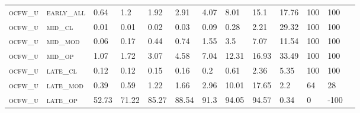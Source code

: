 \begin{landscape}
\begin{table}[!htbp]
\begin{tabular}{@{}lllllllllllll@{}}
\footnotesize \textsc{ocfw\_u}     & \footnotesize \textsc{early\_all}                & \footnotesize 0.64          & \footnotesize 1.2            & \footnotesize 1.92             & \footnotesize 2.91            & \footnotesize 4.07            & \footnotesize 8.01            & \footnotesize 15.1       & \footnotesize 17.76    & \footnotesize 100    & \footnotesize 100    \\
\footnotesize \textsc{ocfw\_u}     & \footnotesize \textsc{mid\_cl   }                & \footnotesize 0.01          & \footnotesize 0.01           & \footnotesize 0.02             & \footnotesize 0.03            & \footnotesize 0.09            & \footnotesize 0.28            & \footnotesize 2.21       & \footnotesize 29.32    & \footnotesize 100    & \footnotesize 100    \\
\footnotesize \textsc{ocfw\_u}     & \footnotesize \textsc{mid\_mod  }                & \footnotesize 0.06          & \footnotesize 0.17           & \footnotesize 0.44             & \footnotesize 0.74            & \footnotesize 1.55            & \footnotesize 3.5             & \footnotesize 7.07       & \footnotesize 11.54    & \footnotesize 100    & \footnotesize 100    \\
\footnotesize \textsc{ocfw\_u}     & \footnotesize \textsc{mid\_op   }                & \footnotesize 1.07          & \footnotesize 1.72           & \footnotesize 3.07             & \footnotesize 4.58            & \footnotesize 7.04            & \footnotesize 12.31           & \footnotesize 16.93      & \footnotesize 33.49    & \footnotesize 100    & \footnotesize 100    \\
\footnotesize \textsc{ocfw\_u}     & \footnotesize \textsc{late\_cl  }                & \footnotesize 0.12          & \footnotesize 0.12           & \footnotesize 0.15             & \footnotesize 0.16            & \footnotesize 0.2             & \footnotesize 0.61            & \footnotesize 2.36       & \footnotesize 5.35     & \footnotesize 100    & \footnotesize 100    \\
\footnotesize \textsc{ocfw\_u}     & \footnotesize \textsc{late\_mod }                & \footnotesize 0.39          & \footnotesize 0.59           & \footnotesize 1.22             & \footnotesize 1.66            & \footnotesize 2.96            & \footnotesize 10.01           & \footnotesize 17.65      & \footnotesize 2.2      & \footnotesize 64     & \footnotesize 28    \\
\footnotesize \textsc{ocfw\_u}     & \footnotesize \textsc{late\_op  }                & \footnotesize 52.73         & \footnotesize 71.22          & \footnotesize 85.27            & \footnotesize 88.54           & \footnotesize 91.3            & \footnotesize 94.05           & \footnotesize 94.57      & \footnotesize 0.34     & \footnotesize 0      & \footnotesize -100    \\
\end{tabular}
\end{table}
\end{landscape}


